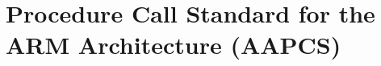 \documentclass[9pt,aspectratio=169,xcolor=table]{beamer}
\begin{document}
\section{Procedure Call Standard for the ARM Architecture (AAPCS)}


%
%
%
%
%
%
%
%
%
%
%
%
\end{document}
